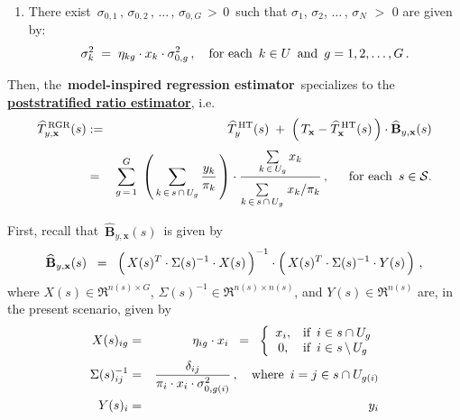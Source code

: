 \begin{proposition}
\begin{enumerate}
\item
	There exist \,$\sigma_{0,1} \,,\, \sigma_{0,2} \,,\, \ldots \,,\, \sigma_{0,G} \,>\, 0$\,
	such that
	$\sigma_{1}$, $\sigma_{2}$, $\ldots$\,, $\sigma_{N}$ $>$ $0$ are given by:
	\begin{equation*}
	\sigma_{k}^{2} \; = \; \eta_{kg} \cdot x_{k} \cdot \sigma_{0,g}^{2}\,,
	\quad\textnormal{for each \,$k \in U$\, and \,$g = 1,2,\ldots,G$}\,.
	\end{equation*}
\end{enumerate}
\renewcommand{\theenumi}{\roman{enumi}}
\renewcommand{\labelenumi}{\textnormal{(\theenumi)}$\;\;$}
Then, the \,\textbf{model-inspired regression estimator}\,
specializes to the \,\underline{\textbf{{\color{red}poststratified ratio} estimator}}, i.e.
\begin{eqnarray*}
\widehat{T}^{\,\textnormal{RGR}}_{y,\mathbf{x}}(s)
& := &
	\widehat{T}^{\,\textnormal{HT}}_{y}(s)
	\; + \;
	\left(\,T_{\mathbf{x}} - \widehat{T}^{\,\textnormal{HT}}_{\mathbf{x}}(s) \,\right)
	\cdot
	\widehat{\mathbf{B}}_{y,\mathbf{x}}(s)
\\
& = &
	\overset{G}{\underset{g\,=\,1}{\sum}}\;
	\left(\,
		\underset{k\,\in\,s\,\cap\,U_{g}}{\sum}\, \dfrac{y_{k}}{\pi_{k}}
	\,\right)
	\cdot
	\dfrac{
		\underset{k\,\in\,U_{g}}{\overset{{\color{white}.}}{\sum}}\, x_{k}
		}{
		\underset{k\,\in\,s\,\cap\,U_{g}}{\overset{{\color{white}.}}{\sum}}\;x_{k}/\pi_{k}
		}
	\,,\;\;\quad\textnormal{for each \,$s \in \mathcal{S}$}.
\end{eqnarray*}
\end{proposition}
\proof
First, recall that \,$\widehat{\mathbf{B}}_{y,\mathbf{x}}(s)$\, is given by
\begin{equation*}
\widehat{\mathbf{B}}_{y,\mathbf{x}}(s)
\;\; = \;\;
	\left(\,X(s)^{T} \overset{{\color{white}!}}{\cdot} \Sigma(s)^{-1} \cdot X(s)\,\right)^{-1}
	\cdot
	\left(\,X(s)^{T} \overset{{\color{white}!}}{\cdot} \Sigma(s)^{-1} \cdot Y(s) \,\right)\,,
\end{equation*}
where $X(s) \in \Re^{n(s) \times G}$, $\Sigma(s)^{-1} \in \Re^{n(s) \times n(s)}$, and $Y(s) \in \Re^{n(s)}$
are, in the present scenario, given by
\begin{eqnarray*}
X(s)_{ig}
& = &
	\eta_{ig} \cdot x_{i}
\;\; = \;\;
	\left\{\begin{array}{cl}
		x_{i}, &  \textnormal{if \,$i \in s \cap U_{g}$}
		\\
		0, & \textnormal{if \,$i \in s\,\backslash\,U_{g}$}
	\end{array}\right.
\\
\Sigma(s)^{-1}_{ij}
& = &
	\dfrac{\delta_{ij}}{\pi_{i}\cdot x_{i} \cdot\sigma^{2}_{0,g(i)}}\,,
	\quad
	\textnormal{where \,$i = j \in s \cap U_{g(i)}$}
\\
Y(s)_{i}
& = &
	y_{i}
\end{eqnarray*}
